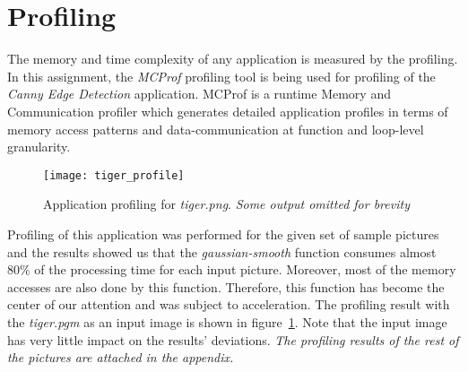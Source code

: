 \section{Profiling}
\label{sec:profiling}
The memory and time complexity of any application is measured by the profiling. In this assignment, the \emph{MCProf} profiling tool is being used for profiling of the \emph{Canny Edge Detection} application. MCProf is a runtime Memory and Communication profiler which generates detailed application profiles in terms of memory access patterns and data-communication at function and loop-level granularity.

\begin{figure}[h]
\centering
\texttt{[image: tiger\_profile]}
\caption{Application profiling for \textit{tiger.png}. \textit{Some output omitted for brevity}}
\label{fig:prof}
\end{figure}

Profiling of this application was performed for the given set of sample pictures and the results showed us that the \emph{gaussian-smooth} function consumes almost 80\% of the processing time for each input picture. Moreover, most of the memory accesses are also done by this function. Therefore, this function has become the center of our attention and was subject to acceleration. The profiling result with the \emph{tiger.pgm} as an input image is shown in figure~\ref{fig:prof}. Note that the input image has very little impact on the results' deviations.
\textit{The profiling results of the rest of the pictures are attached in the appendix.}
